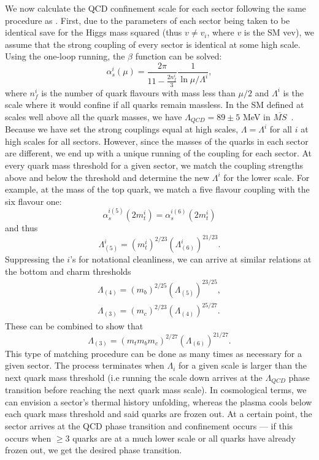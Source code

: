 \documentclass[nofootinbib,twocolumn,preprintnumbers]{revtex4-1}
\begin{document}
We now calculate the QCD confinement scale for each sector following the same procedure as \cite{Cui:2011wk}. First, due to the parameters of each sector being taken to be identical save for the Higgs mass squared (thus $v \neq v_i$, where $v$ is the SM vev), we assume that the strong coupling of every sector is identical at some high scale. Using the one-loop running, the $\beta$ function can be solved:
\begin{equation}\label{eqn:QCDrunningi}
\alpha_{s}^i (\mu) = \frac{2\pi}{11-\frac{2n^i_f}{3}}\frac{1}{\ln{\mu/\Lambda^i}},
\end{equation}
where $n_f^i$ is the number of quark flavours with mass less than $\mu/2$ and $\Lambda^i$ is the scale where it would confine if all quarks remain massless. In the SM defined at scales well above all the quark masses, we have $\Lambda_{QCD} = 89 \pm 5$ MeV in $\overline{MS}$~\cite{PhysRevD.98.030001}. 
Because we have set the strong couplings equal at high scales, $\Lambda = \Lambda^i$ for all $i$ at high scales for all sectors. However, since the masses of the quarks in each sector are different, we end up with a unique running of the coupling for each sector. At every quark mass threshold for a given sector, we match the coupling strengths above and below the threshold and determine the new $\Lambda^i$ for the lower scale. For example, at the mass of the top quark, we match a five flavour coupling with the six flavour one:
\begin{equation}
\alpha_s^{i(5)}(2 m^i_t) = \alpha_s^{i(6)}(2 m^i_t) 
\end{equation} 
and thus
\begin{equation}
\Lambda_{(5)}^i = (m_t^{i})^{2/23}(\Lambda_{(6)}^i)^{21/23}.
\end{equation}
Suppressing the $i$'s for notational cleanliness, we can arrive at similar relations at the bottom and charm thresholds
\begin{equation}
\begin{split}
\Lambda_{(4)} = (m_b)^{2/25}(\Lambda_{(5)})^{23/25},
\\
\Lambda_{(3)} = (m_c)^{2/23}(\Lambda_{(4)})^{25/27}.
\end{split}
\end{equation}
These can be combined to show that
\begin{equation}
\Lambda_{(3)} = (m_t m_b m_c)^{2/27}(\Lambda_{(6)})^{21/27}.
\end{equation}
This type of matching procedure can be done as many times as necessary for a given sector. The process terminates when $\Lambda_i$ for a given scale is larger than the next quark mass threshold (i.e running the scale down arrives at the $\Lambda_{QCD}$ phase transition before reaching the next quark mass scale).
In cosmological terms, we can envision a sector's thermal history unfolding, whereas the plasma cools below each quark mass threshold and said quarks are frozen out. At a certain point, the sector arrives at the QCD phase transition and confinement occurs --- if this occurs when $\geq 3$ quarks are at a much lower scale or all quarks have already frozen out, we get the desired phase transition.   
\end{document}
